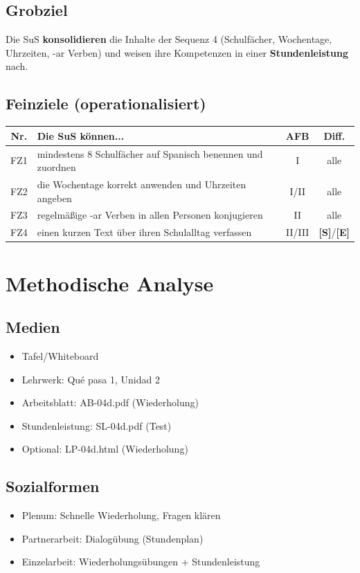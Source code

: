 \documentclass[11pt,a4paper]{article}
\newcommand{\lehrwerk}{Qué pasa 1}
\newcommand{\lehrwerkseite}{Unidad 2}
\newcommand{\Std}{\textcolor{standard}{\textbf{[S]}}}
\newcommand{\E}{\textcolor{erweiterung}{\textbf{[E]}}}
\begin{document}
\subsection{Grobziel}
Die SuS \textbf{konsolidieren} die Inhalte der Sequenz 4 (Schulfächer, Wochentage, Uhrzeiten, -ar Verben) und weisen ihre Kompetenzen in einer \textbf{Stundenleistung} nach.

\subsection{Feinziele (operationalisiert)}
\begin{tabular}{|c|p{8cm}|c|c|}
\hline
\textbf{Nr.} & \textbf{Die SuS können...} & \textbf{AFB} & \textbf{Diff.} \\
\hline
FZ1 & mindestens 8 Schulfächer auf Spanisch benennen und zuordnen & I & alle \\
\hline
FZ2 & die Wochentage korrekt anwenden und Uhrzeiten angeben & I/II & alle \\
\hline
FZ3 & regelmäßige -ar Verben in allen Personen konjugieren & II & alle \\
\hline
FZ4 & einen kurzen Text über ihren Schulalltag verfassen & II/III & \Std{}/\E{} \\
\hline
\end{tabular}

\section{Methodische Analyse}

\subsection{Medien}
\begin{itemize}
    \item Tafel/Whiteboard
    \item Lehrwerk: \lehrwerk, \lehrwerkseite
    \item Arbeitsblatt: AB-04d.pdf (Wiederholung)
    \item Stundenleistung: SL-04d.pdf (Test)
    \item Optional: LP-04d.html (Wiederholung)
\end{itemize}

\subsection{Sozialformen}
\begin{itemize}
    \item Plenum: Schnelle Wiederholung, Fragen klären
    \item Partnerarbeit: Dialogübung (Stundenplan)
    \item Einzelarbeit: Wiederholungsübungen + Stundenleistung
\end{itemize}
\end{document}
